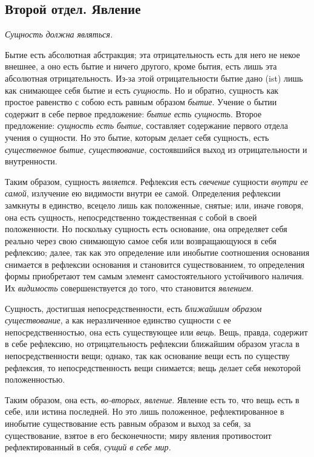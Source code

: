 \clearpage\subsection{Второй отдел. Явление}
{\em Сущность должна являться.}

Бытие есть абсолютная абстракция; эта отрицательность есть для него не некое
внешнее, а оно есть бытие и ничего другого, кроме бытия, есть лишь эта
абсолютная отрицательность. Из-за этой отрицательности бытие дано (ist)
лишь как снимающее себя бытие и есть {\em сущность}. Но
и обратно, сущность как простое равенство с собою есть равным образом
{\em бытие}. Учение о бытии содержит в себе первое
предложение: {\em бытие есть сущность}. Второе
предложение: {\em сущность есть бытие}, составляет
содержание первого отдела учения о сущности. Но это бытие, которым делает
себя сущность, есть {\em существенное бытие,}
{\em существование}, состоявшийся выход из
отрицательности и внутренности.

Таким образом, сущность {\em является}. Рефлексия есть
{\em свечение} сущности {\em внутри
ее самой}, излучение ею видимости внутри ее самой. Определения рефлексии
замкнуты в единство, всецело лишь как положенные, снятые; или, иначе
говоря, она есть сущность, непосредственно тождественная с собой в своей
положенности. Но поскольку сущность есть основание, она определяет себя
реально через свою снимающую самое себя или возвращающуюся в себя
рефлексию; далее, так как это определение или инобытие соотношения
основания снимается в рефлексии основания и становится существованием, то
определения формы приобретают тем самым элемент самостоятельного
устойчивого наличия. Их {\em видимость}
совершенствуется до того, что становится
{\em явлением}.

Сущность, достигшая непосредственности, есть
{\em ближайшим образом существование}, а как
неразличенное единство сущности с ее непосредственностью, она есть
существующее или {\em вещь}. Вещь, правда, содержит в
себе рефлексию, но отрицательность рефлексии ближайшим образом угасла в
непосредственности вещи; однако, так как основание вещи есть по существу
рефлексия, то непосредственность вещи снимается; вещь делает себя некоторой
положенностью.

Таким образом, она есть, {\em во-вторых},
{\em явление}. Явление есть то, что вещь есть в себе,
или истина последней. Но это лишь положенное, рефлектированное в инобытие
существование есть равным образом и выход за себя, за существование, взятое
в его бесконечности; миру явления противостоит рефлектированный в себя,
{\em сущий в себе мир}.

